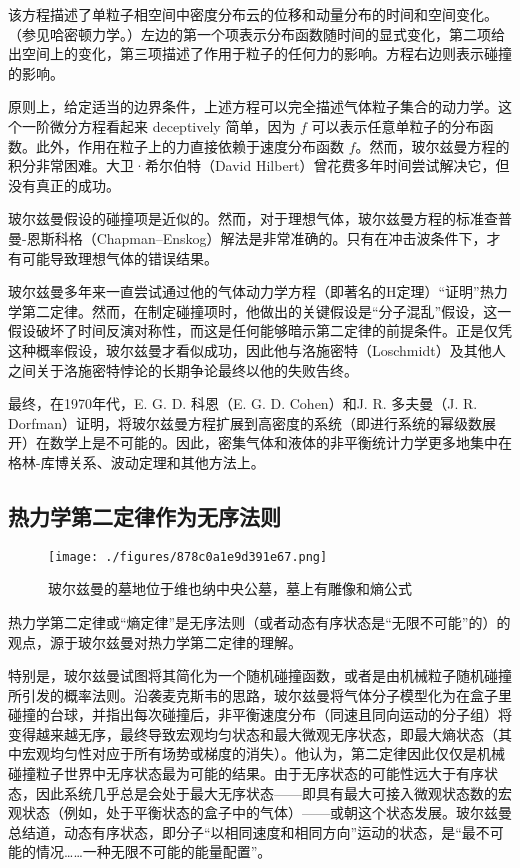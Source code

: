 该方程描述了单粒子相空间中密度分布云的位移和动量分布的时间和空间变化。（参见哈密顿力学。）左边的第一个项表示分布函数随时间的显式变化，第二项给出空间上的变化，第三项描述了作用于粒子的任何力的影响。方程右边则表示碰撞的影响。

原则上，给定适当的边界条件，上述方程可以完全描述气体粒子集合的动力学。这个一阶微分方程看起来 deceptively 简单，因为 \( f \) 可以表示任意单粒子的分布函数。此外，作用在粒子上的力直接依赖于速度分布函数 \( f \)。然而，玻尔兹曼方程的积分非常困难。大卫·希尔伯特（David Hilbert）曾花费多年时间尝试解决它，但没有真正的成功。

玻尔兹曼假设的碰撞项是近似的。然而，对于理想气体，玻尔兹曼方程的标准查普曼-恩斯科格（Chapman–Enskog）解法是非常准确的。只有在冲击波条件下，才有可能导致理想气体的错误结果。

玻尔兹曼多年来一直尝试通过他的气体动力学方程（即著名的H定理）“证明”热力学第二定律。然而，在制定碰撞项时，他做出的关键假设是“分子混乱”假设，这一假设破坏了时间反演对称性，而这是任何能够暗示第二定律的前提条件。正是仅凭这种概率假设，玻尔兹曼才看似成功，因此他与洛施密特（Loschmidt）及其他人之间关于洛施密特悖论的长期争论最终以他的失败告终。

最终，在1970年代，E. G. D. 科恩（E. G. D. Cohen）和J. R. 多夫曼（J. R. Dorfman）证明，将玻尔兹曼方程扩展到高密度的系统（即进行系统的幂级数展开）在数学上是不可能的。因此，密集气体和液体的非平衡统计力学更多地集中在格林-库博关系、波动定理和其他方法上。
\subsection{热力学第二定律作为无序法则}
\begin{figure}[ht]
\centering
\texttt{[image: ./figures/878c0a1e9d391e67.png]}
\caption{玻尔兹曼的墓地位于维也纳中央公墓，墓上有雕像和熵公式} \label{fig_BRZM_5}
\end{figure}
热力学第二定律或“熵定律”是无序法则（或者动态有序状态是“无限不可能”的）的观点，源于玻尔兹曼对热力学第二定律的理解。

特别是，玻尔兹曼试图将其简化为一个随机碰撞函数，或者是由机械粒子随机碰撞所引发的概率法则。沿袭麦克斯韦的思路，玻尔兹曼将气体分子模型化为在盒子里碰撞的台球，并指出每次碰撞后，非平衡速度分布（同速且同向运动的分子组）将变得越来越无序，最终导致宏观均匀状态和最大微观无序状态，即最大熵状态（其中宏观均匀性对应于所有场势或梯度的消失）。他认为，第二定律因此仅仅是机械碰撞粒子世界中无序状态最为可能的结果。由于无序状态的可能性远大于有序状态，因此系统几乎总是会处于最大无序状态——即具有最大可接入微观状态数的宏观状态（例如，处于平衡状态的盒子中的气体）——或朝这个状态发展。玻尔兹曼总结道，动态有序状态，即分子“以相同速度和相同方向”运动的状态，是“最不可能的情况……一种无限不可能的能量配置”。

